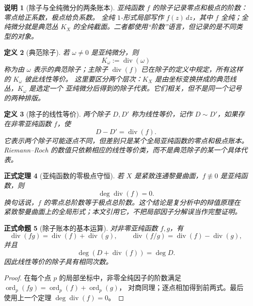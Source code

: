 \documentclass[UTF8,fontset=none,a4paper,11pt]{ctexart}
\theoremstyle{foundation-definition}
\newtheorem{definition}{定义}[section]
\theoremstyle{foundation-theorem}
\newtheorem{theorem}[definition]{正式定理}
\theoremstyle{foundation-proposition}
\newtheorem{proposition}[definition]{正式命题}
\theoremstyle{foundation-example}
\theoremstyle{foundation-remark}
\newtheorem{remark}[definition]{说明}
\theoremstyle{foundation-theorem}
\begin{document}
\begin{remark}[除子与全纯微分的两条账本]
亚纯函数 \(f\) 的除子记录零点和极点的阶数：零点给正系数，极点给负系数。
全纯 \(1\)-形式局部写作 \(f(z)\,dz\)，其中 \(f\) 全纯；全纯微分就是典范丛
\(K_X\) 的全纯截面。二者都使用“阶数”语言，但记录的是不同类型的对象。
\end{remark}

\begin{definition}[典范除子]\label{def:principal-canonical-divisor}
若
\(\omega\neq0\) 是亚纯微分，则
\[
K_\omega:=\operatorname{div}(\omega)
\]
称为由 \(\omega\) 表示的典范除子；主除子 \(\operatorname{div}(f)\) 已在除子的定义中规定，所有这样的 \(K_\omega\) 彼此线性等价。
这里要区分两个层次：\(K_X\) 是由坐标变换拼成的典范线丛，\(K_\omega\) 是选定一个
亚纯微分后得到的除子代表。它们相关，但不是同一个记号的两种排版。
\end{definition}

\begin{definition}[除子的线性等价]\label{def:linear-equivalence-divisor}
两个除子 \(D,D'\) 称为线性等价，记作 \(D\sim D'\)，如果存在非零亚纯函数 \(f\)，使
\[
D-D'=\operatorname{div}(f).
\]
它表示两个除子可能逐点不同，但差别只是某个全局亚纯函数的零点和极点账本。Riemann--Roch 的数值只依赖相应的线性等价类，而不是典范除子的某一个具体代表。
\end{definition}

\begin{theorem}[亚纯函数的零极点守恒]\label{thm:meromorphic-divisor-degree-zero}
若 \(X\) 是紧致连通黎曼曲面，\(f\not\equiv0\) 是亚纯函数，则
\[
\deg\operatorname{div}(f)=0.
\]
换句话说，\(f\) 的零点总阶数等于极点总阶数。这个结论是复分析中的辩值原理在
紧致黎曼曲面上的全局形式；本文引用它，不把局部因子分解误当作完整证明。
\end{theorem}

\begin{proposition}[除子账本的基本运算]
对非零亚纯函数 \(f,g\)，有
\[
\operatorname{div}(fg)=\operatorname{div}(f)+\operatorname{div}(g),
\qquad
\operatorname{div}(f/g)=\operatorname{div}(f)-\operatorname{div}(g),
\]
并且
\[
\deg(D+\operatorname{div}(f))=\deg D.
\]
因此线性等价的除子具有相同次数。
\end{proposition}

\begin{proof}
在每个点 \(p\) 的局部坐标中，非零全纯因子的阶数满足
\(\operatorname{ord}_p(fg)=\operatorname{ord}_p(f)+\operatorname{ord}_p(g)\)，
对商同理；逐点相加得到前两式。最后使用上一个定理
\(\deg\operatorname{div}(f)=0\)。
\end{proof}
\end{document}
